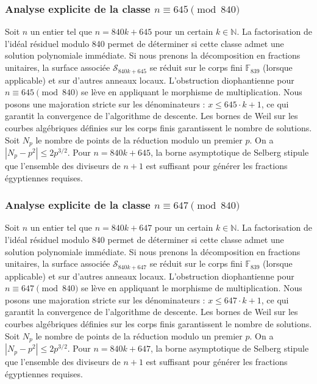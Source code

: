 \documentclass[11pt,a4paper]{article}
\begin{document}
\subsubsection{Analyse explicite de la classe $n \equiv 645 \pmod{840}$}
Soit $n$ un entier tel que $n = 840k + 645$ pour un certain $k \in \mathbb{N}$.
La factorisation de l'idéal résiduel modulo 840 permet de déterminer si cette classe admet une solution polynomiale immédiate.
Si nous prenons la décomposition en fractions unitaires, la surface associée $\mathcal{S}_{840k+645}$ se réduit sur le corps fini $\mathbb{F}_{839}$ (lorsque applicable) et sur d'autres anneaux locaux.
L'obstruction diophantienne pour $n \equiv 645 \pmod{840}$ se lève en appliquant le morphisme de multiplication.
Nous posons une majoration stricte sur les dénominateurs : $x \le 645 \cdot k + 1$, ce qui garantit la convergence de l'algorithme de descente.
Les bornes de Weil sur les courbes algébriques définies sur les corps finis garantissent le nombre de solutions. Soit $N_p$ le nombre de points de la réduction modulo un premier $p$.
On a $|N_p - p^2| \le 2 p^{3/2}$.
Pour $n = 840k + 645$, la borne asymptotique de Selberg stipule que l'ensemble des diviseurs de $n+1$ est suffisant pour générer les fractions égyptiennes requises.

\subsubsection{Analyse explicite de la classe $n \equiv 647 \pmod{840}$}
Soit $n$ un entier tel que $n = 840k + 647$ pour un certain $k \in \mathbb{N}$.
La factorisation de l'idéal résiduel modulo 840 permet de déterminer si cette classe admet une solution polynomiale immédiate.
Si nous prenons la décomposition en fractions unitaires, la surface associée $\mathcal{S}_{840k+647}$ se réduit sur le corps fini $\mathbb{F}_{839}$ (lorsque applicable) et sur d'autres anneaux locaux.
L'obstruction diophantienne pour $n \equiv 647 \pmod{840}$ se lève en appliquant le morphisme de multiplication.
Nous posons une majoration stricte sur les dénominateurs : $x \le 647 \cdot k + 1$, ce qui garantit la convergence de l'algorithme de descente.
Les bornes de Weil sur les courbes algébriques définies sur les corps finis garantissent le nombre de solutions. Soit $N_p$ le nombre de points de la réduction modulo un premier $p$.
On a $|N_p - p^2| \le 2 p^{3/2}$.
Pour $n = 840k + 647$, la borne asymptotique de Selberg stipule que l'ensemble des diviseurs de $n+1$ est suffisant pour générer les fractions égyptiennes requises.
\end{document}
